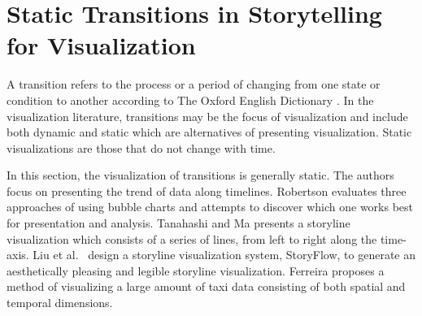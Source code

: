 \documentclass{egpubl}
\begin{document}
\section{Static Transitions in Storytelling for Visualization}
A transition refers to the process or a period of changing from one state or condition to another according to The Oxford English Dictionary \cite{transition}. In the visualization literature, transitions may be the focus of visualization and include both dynamic and static which are alternatives of presenting visualization. Static visualizations are those that do not change with time. 

In this section, the visualization of transitions is generally static. The authors focus on presenting the trend of data along timelines. Robertson \cite{Rebortson} evaluates three approaches of using bubble charts and attempts to discover which one works best for presentation and analysis. Tanahashi and Ma \cite{Tanahashi} presents a storyline visualization which consists of a series of lines, from left to right along the time-axis.  Liu et al.\ \cite{shixia} design a storyline visualization system, StoryFlow, to generate an aesthetically pleasing and legible storyline visualization. Ferreira \cite{ferreira2013} proposes a method of visualizing a large amount of taxi data consisting of both spatial and temporal dimensions.
\end{document}
